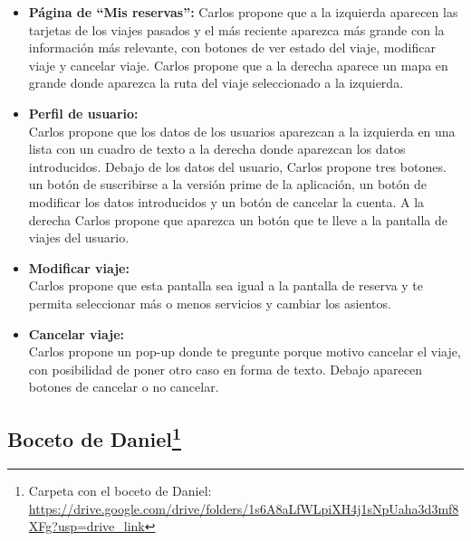 \begin{itemize}
      \item\textbf{Página de ``Mis reservas'':} Carlos propone que a la izquierda aparecen las tarjetas de los viajes pasados y el más reciente aparezca más grande con la información más relevante, con botones de ver estado del viaje, modificar viaje y cancelar viaje.
            Carlos propone que a la derecha aparece un mapa en grande donde aparezca la ruta del viaje seleccionado a la izquierda.

      \item\textbf{Perfil de usuario:} \\ Carlos propone que los datos de los usuarios aparezcan a la izquierda en una lista con un cuadro de texto a la derecha donde aparezcan los datos introducidos.
            Debajo de los datos del usuario, Carlos propone tres botones. un botón de suscribirse a la versión prime de la aplicación, un botón de modificar los datos introducidos y un botón de cancelar la cuenta.
            A la derecha Carlos propone que aparezca un botón que te lleve a la pantalla de viajes del usuario.

      \item\textbf{Modificar viaje:} \\ Carlos propone que esta pantalla sea igual a  la pantalla de reserva y te permita seleccionar más o menos servicios y cambiar los asientos.
      \item\textbf{Cancelar viaje:} \\ Carlos propone un pop-up donde te pregunte porque motivo cancelar el viaje, con posibilidad de poner otro caso en forma de texto.
            Debajo aparecen botones de cancelar o no cancelar.

\end{itemize}
\subsection[Boceto de Daniel]{Boceto de Daniel\footnote{Carpeta con el boceto de Daniel: \url{https://drive.google.com/drive/folders/1s6A8aLfWLpiXH4j1sNpUaha3d3mf8XFg?usp=drive_link}}}

